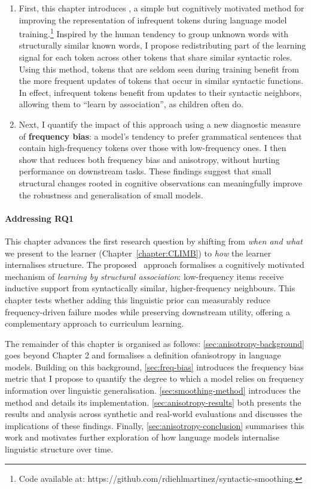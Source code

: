 \begin{enumerate}
    \item First, this chapter introduces \smoothing, a simple but cognitively motivated method for improving the representation of infrequent tokens during language model training.\footnote{Code available at: https://github.com/rdiehlmartinez/syntactic-smoothing.} Inspired by the human tendency to group unknown words with structurally similar known words, I propose redistributing part of the learning signal for each token across other tokens that share similar syntactic roles. Using this method, tokens that are seldom seen during training benefit from the more frequent updates of tokens that occur in similar syntactic functions.  In effect, infrequent tokens benefit from updates to their syntactic neighbors, allowing them to ``learn by association'', as children often do.
    \item Next, I quantify the impact of this approach using a new diagnostic measure of \textbf{frequency bias}: a model's tendency to prefer grammatical sentences that contain high-frequency tokens over those with low-frequency ones. I then show that \smoothing reduces both frequency bias and anisotropy, without hurting performance on downstream tasks. These findings suggest that small structural changes rooted in cognitive observations can meaningfully improve the robustness and generalisation of small models.
     
\end{enumerate}

\paragraph{Addressing RQ1} This chapter advances the first research question by shifting from \emph{when and what} we present to the learner (Chapter~\ref{chapter:CLIMB}) to \emph{how} the learner internalises structure. The proposed \smoothing\ approach formalises a cognitively motivated mechanism of \emph{learning by structural association}: low-frequency items receive inductive support from syntactically similar, higher-frequency neighbours. This chapter tests whether adding this linguistic prior can measurably reduce frequency-driven failure modes while preserving downstream utility, offering a complementary approach to curriculum learning.

\vspace{1em}

The remainder of this chapter is organised as follows: \cref{sec:anisotropy-background} goes beyond Chapter 2 and formalises a definition ofanisotropy in language models. Building on this background, \cref{sec:freq-bias} introduces the frequency bias metric that I propose to quantify the degree to which a model relies on frequency information over linguistic generalisation. \cref{sec:smoothing-method} introduces the \smoothing method and details its implementation. \cref{sec:anisotropy-results} both presents the results and analysis across synthetic and real-world evaluations and discusses the implications of these findings. Finally, \cref{sec:anisotropy-conclusion} summarises this work and motivates further exploration of how language models internalise linguistic structure over time.

